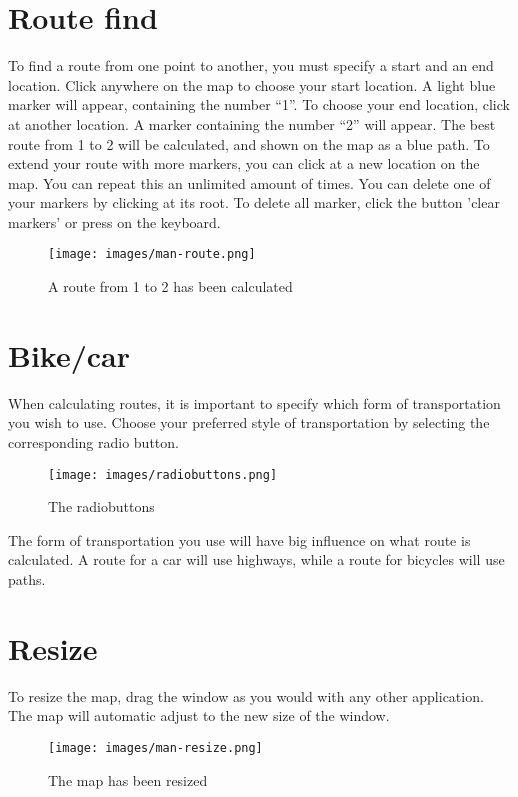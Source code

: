 \section{Route find}
\label{MAN-RF}
To find a route from one point to another, you must specify a start and an end
location. Click anywhere on the map to choose your start location. A light blue
marker will appear, containing the number ``1''. To choose your end location,
click at another location. A marker containing the number ``2'' will appear. The
best route from 1 to 2 will be calculated, and shown on the map as a blue path.
To extend your route with more markers, you can click at a new location on the
map. You can repeat this an unlimited amount of times. You can delete one of
your markers by clicking at its root. To delete all marker, click the button
'clear markers' or press  on the keyboard.

\begin{figure}[h!]
\centering
\texttt{[image: images/man-route.png]}
\caption{A route from 1 to 2 has been calculated}
\label{MAN-RF-IMG}
\end{figure}

\section{Bike/car}
\label{MAN-BC}
When calculating routes, it is important to specify which form of
transportation you wish to use. Choose your preferred style of transportation by
selecting the corresponding radio button.

\begin{figure}[h!]
\centering
\texttt{[image: images/radiobuttons.png]}
\caption{The radiobuttons}
\label{MAN-BC-IMG}
\end{figure}

The form of transportation you use will have big influence on what route is
calculated. A route for a car will use highways, while a route for bicycles will
use paths.

\section{Resize}
\label{MAN-RS}
To resize the map, drag the window as you would with any other application. The
map will automatic adjust to the new size of the window.
\begin{figure}[h!]
\centering
\texttt{[image: images/man-resize.png]}
\caption{The map has been resized}
\label{man-radio}
\end{figure}